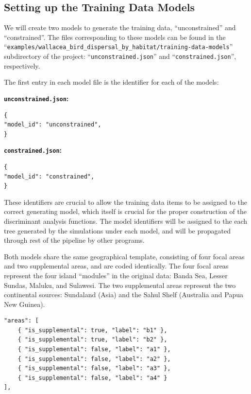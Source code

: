 \documentclass[11pt,openany]{memoir} %
\begin{document}
\subsection{Setting up the Training Data Models}

We will create two models to generate the training data, ``unconstrained'' and ``constrained''.
The files corresponding to these models can be found in the ``\texttt{examples/wallacea\_bird\_dispersal\_by\_habitat/training-data-models}'' subdirectory of the project: ``\texttt{unconstrained.json}'' and ``\texttt{constrained.json}'', respectively.

The first entry in each model file is the identifier for each of the models:

\begin{minipage}[t]{0.475\textwidth}
\textbf{\texttt{unconstrained.json}:}
\begin{lstlisting}
{
"model_id": "unconstrained",
}\end{lstlisting}
\end{minipage}
\begin{minipage}[t]{0.475\textwidth}
\textbf{\texttt{constrained.json}:}
\begin{lstlisting}
{
"model_id": "constrained",
}\end{lstlisting}
\end{minipage}

These identifiers are crucial to allow the training data items to be assigned to the correct generating model, which itself is crucial for the proper construction of the discriminant analysis functions.
The model identifiers will be assigned to the each tree generated by the simulations under each model, and will be propagated through rest of the pipeline by other programs.

Both models share the same geographical template, consisting of four focal areas and two supplemental areas, and are coded identically.
The four focal areas represent the four island ``modules'' in the original data: Banda Sea, Lesser Sundas, Maluku, and Sulawesi.
The two supplemental areas represent the two continental sources: Sundaland (Asia) and the Sahul Shelf (Australia and Papua New Guinea).
\begin{lstlisting}
"areas": [
    { "is_supplemental": true, "label": "b1" },
    { "is_supplemental": true, "label": "b2" },
    { "is_supplemental": false, "label": "a1" },
    { "is_supplemental": false, "label": "a2" },
    { "is_supplemental": false, "label": "a3" },
    { "is_supplemental": false, "label": "a4" }
], \end{lstlisting}
\end{document}
